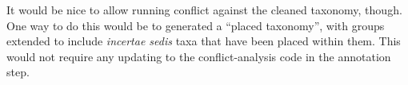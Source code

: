 \documentclass[english]{article}
\begin{document}
It would be nice to allow running conflict against the cleaned
taxonomy, though.
One way to do this would be to generated a ``placed
taxonomy'', with groups extended to include \emph{incertae sedis} taxa
that have been placed within them.
This would not require any updating
to the conflict-analysis code in the annotation step.

\end{document}
